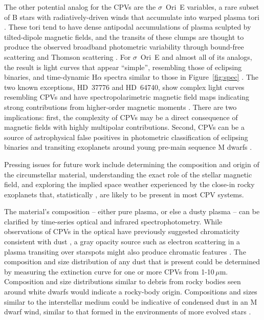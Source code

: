 \documentclass{nature3}
\begin{document}
The other potential analog for the CPVs are the $\sigma$~Ori~E
variables, a rare subset of B stars with radiatively-driven winds that
accumulate into warped plasma tori \cite{Townsend2005,Townsend2008}.
These tori tend to have dense antipodal accumulations of plasma sculpted
by tilted-dipole magnetic fields, and the transits of these clumps are
thought to produce the observed broadband photometric variability
through bound-free scattering \cite{Townsend2005} and Thomson scattering
\cite{Berry2022}.  For $\sigma$~Ori~E and almost all of its analogs, the
result is light curves that appear ``simple'', resembling those of
eclipsing binaries, and time-dynamic H$\alpha$ spectra similar to those
in Figure~\ref{fig:spec} \cite{Townsend2005,Townsend2008}.  The two known exceptions,
HD~37776 and HD~64740, show complex light curves resembling CPVs
\cite{Mikulasek2020,Bouma2024} and have spectropolarimetric magnetic
field maps indicating strong contributions from higher-order magnetic
moments \cite{Kochukhov2011,Shultz2018}.  There are two implications:
first, the complexity of CPVs may be a direct consequence of magnetic
fields with highly multipolar contributions.  Second, CPVs can be a
source of astrophysical false positives in photometric classification
of eclipsing binaries and transiting exoplanets around young pre-main
sequence M dwarfs \cite{Johns-Krull2016,Bouma2020}.

Pressing issues for future work include determining the composition and
origin of the circumstellar material, understanding the exact role of
the stellar magnetic field, and exploring the implied space weather
experienced by the close-in rocky exoplanets that, statistically
\cite{Dressing2015}, are likely to be present in most CPV systems.

The material's composition -- either pure plasma, or else a dusty plasma
-- can be clarified by time-series optical and infrared
spectrophotometry.  While observations of CPVs in the optical have
previously suggested chromaticity consistent with dust
\cite{Tanimoto2020,Gunther2022,Koen2023}, a gray opacity source such as
electron scattering in a plasma transiting over starspots might also
produce chromatic features \cite{Rackham2018}.  The composition and size
distribution of any dust that is present could be determined
by measuring the extinction curve for one or more CPVs from
1-10\,$\mu$m.  Composition and size distributions similar to debris from
rocky bodies seen around white dwarfs \cite{Reach2009} would indicate a
rocky-body origin.  Compositions and sizes similar to the interstellar
medium could be indicative of condensed dust in an M dwarf wind,
similar to that formed in the environments of more evolved stars
\cite{Marigo2008}.
\end{document}
